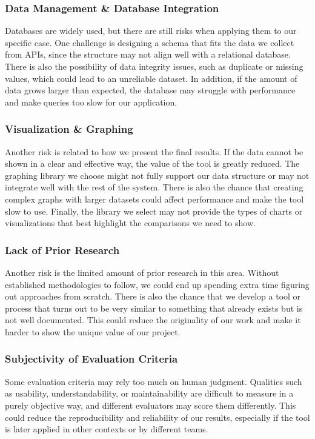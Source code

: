 \documentclass{article}
\begin{document}
\subsubsection*{Data Management \& Database Integration}\vspace{-0.5em}
Databases are widely used, but there are still risks when applying them to our specific case. One challenge is designing a schema that fits the data we collect from APIs, since the structure may not align well with a relational database. There is also the possibility of data integrity issues, such as duplicate or missing values, which could lead to an unreliable dataset. In addition, if the amount of data grows larger than expected, the database may struggle with performance and make queries too slow for our application.

\subsubsection*{Visualization \& Graphing}\vspace{-0.5em}
Another risk is related to how we present the final results. If the data cannot be shown in a clear and effective way, the value of the tool is greatly reduced. The graphing library we choose might not fully support our data structure or may not integrate well with the rest of the system. There is also the chance that creating complex graphs with larger datasets could affect performance and make the tool slow to use. Finally, the library we select may not provide the types of charts or visualizations that best highlight the comparisons we need to show.

\subsubsection*{Lack of Prior Research}\vspace{-0.5em}
Another risk is the limited amount of prior research in this area. Without established methodologies to follow, we could end up spending extra time figuring out approaches from scratch. There is also the chance that we develop a tool or process that turns out to be very similar to something that already exists but is not well documented. This could reduce the originality of our work and make it harder to show the unique value of our project.
\subsubsection*{Subjectivity of Evaluation Criteria}\vspace{-0.5em}
Some evaluation criteria may rely too much on human judgment. Qualities such as usability, understandability, or maintainability are difficult to measure in a purely objective way, and different evaluators may score them differently. This could reduce the reproducibility and reliability of our results, especially if the tool is later applied in other contexts or by different teams.
\end{document}
